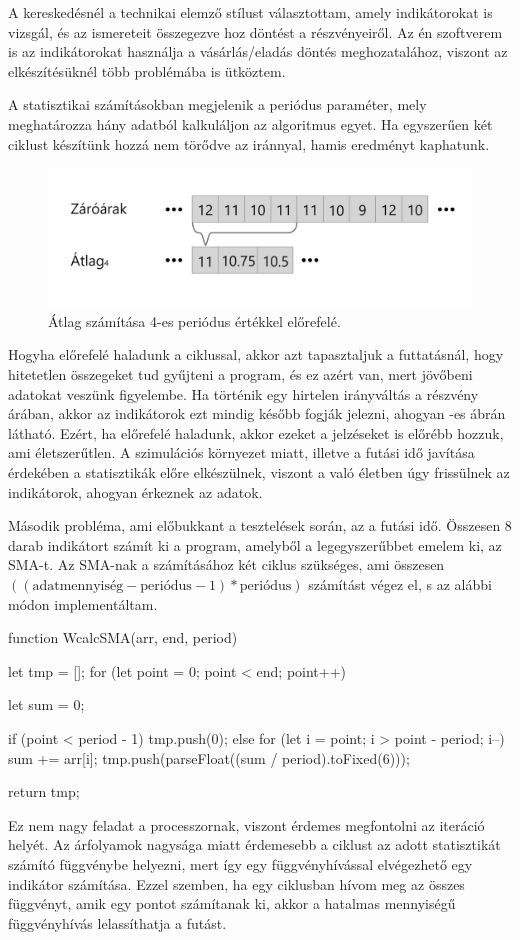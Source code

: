 A kereskedésnél a technikai elemző stílust választottam, amely indikátorokat is vizsgál, és az ismereteit összegezve hoz döntést a részvényeiről. Az én szoftverem is az indikátorokat használja a vásárlás/eladás döntés meghozatalához, viszont az elkészítésüknél több problémába is ütköztem.

A statisztikai számításokban megjelenik a periódus paraméter, mely meghatározza hány adatból kalkuláljon az algoritmus egyet. Ha egyszerűen két  ciklust készítünk hozzá nem törődve az iránnyal, hamis eredményt kaphatunk.
\begin{figure}[ht]
\centering
\includegraphics[scale=0.18]{images/stat.png}
\caption{Átlag számítása 4-es periódus értékkel előrefelé.}
\label{fig:stat}
\end{figure}

\noindent Hogyha előrefelé haladunk a ciklussal, akkor azt tapasztaljuk a futtatásnál, hogy hitetetlen összegeket tud gyűjteni a program, és ez azért van, mert jövőbeni adatokat veszünk figyelembe. Ha történik egy hirtelen irányváltás a részvény árában, akkor az indikátorok ezt mindig később fogják jelezni, ahogyan -es ábrán látható. Ezért, ha előrefelé haladunk, akkor ezeket a jelzéseket is előrébb hozzuk, ami életszerűtlen. A szimulációs környezet miatt, illetve a futási idő javítása érdekében a statisztikák előre elkészülnek, viszont a való életben úgy frissülnek az indikátorok, ahogyan érkeznek az adatok.

Második probléma, ami előbukkant a tesztelések során, az a futási idő. Összesen 8 darab indikátort számít ki a program, amelyből a legegyszerűbbet emelem ki, az SMA-t. Az SMA-nak a számításához két  ciklus szükséges, ami összesen $((\text{adatmennyiség} - \text{periódus} - 1) * \text{periódus})$ számítást végez el, s az alábbi módon implementáltam.
\begin{javascript}
function WcalcSMA(arr, end, period) {
    let tmp = [];
    for (let point = 0; point < end; point++) {
        let sum = 0;

        if (point < period - 1) {
            tmp.push(0);
        } else {
            for (let i = point; i > point - period; i--) {
                sum += arr[i];
            }
            tmp.push(parseFloat((sum / period).toFixed(6)));
        }
    }
    return tmp;
}
\end{javascript}
Ez nem nagy feladat a processzornak, viszont érdemes megfontolni az iteráció helyét. Az árfolyamok nagysága miatt érdemesebb a ciklust az adott statisztikát számító függvénybe helyezni, mert így egy függvényhívással elvégezhető egy indikátor számítása. Ezzel szemben, ha egy ciklusban hívom meg az összes függvényt, amik egy pontot számítanak ki, akkor a hatalmas mennyiségű függvényhívás lelassíthatja a futást.

